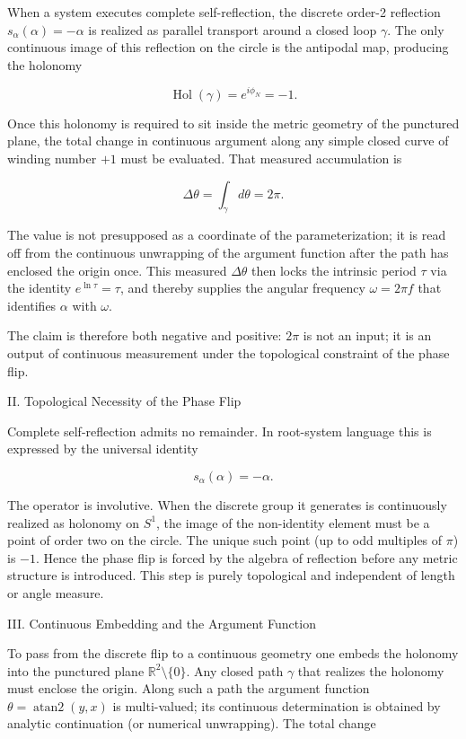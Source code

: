 When a system executes complete self-reflection, the discrete order-2 reflection \(s_\alpha(\alpha)=-\alpha\) is realized as parallel transport around a closed loop \(\gamma\). The only continuous image of this reflection on the circle is the antipodal map, producing the holonomy  

\[
\operatorname{Hol}(\gamma)=e^{i\phi_N}=-1.
\]

Once this holonomy is required to sit inside the metric geometry of the punctured plane, the total change in continuous argument along any simple closed curve of winding number \(+1\) must be evaluated. That measured accumulation is  

\[
\Delta\theta=\int_\gamma d\theta=2\pi.
\]

The value is not presupposed as a coordinate of the parameterization; it is read off from the continuous unwrapping of the argument function after the path has enclosed the origin once. This measured \(\Delta\theta\) then locks the intrinsic period \(\tau\) via the identity \(e^{\ln\tau}=\tau\), and thereby supplies the angular frequency \(\omega=2\pi f\) that identifies \(\alpha\) with \(\omega\).

The claim is therefore both negative and positive: \(2\pi\) is not an input; it is an output of continuous measurement under the topological constraint of the phase flip.

II. Topological Necessity of the Phase Flip

Complete self-reflection admits no remainder. In root-system language this is expressed by the universal identity  

\[
s_\alpha(\alpha)=-\alpha.
\]

The operator is involutive. When the discrete group it generates is continuously realized as holonomy on \(S^1\), the image of the non-identity element must be a point of order two on the circle. The unique such point (up to odd multiples of \(\pi\)) is \(-1\). Hence the phase flip is forced by the algebra of reflection before any metric structure is introduced. This step is purely topological and independent of length or angle measure.

III. Continuous Embedding and the Argument Function

To pass from the discrete flip to a continuous geometry one embeds the holonomy into the punctured plane \(\mathbb{R}^2\setminus\{0\}\). Any closed path \(\gamma\) that realizes the holonomy must enclose the origin. Along such a path the argument function \(\theta=\operatorname{atan2}(y,x)\) is multi-valued; its continuous determination is obtained by analytic continuation (or numerical unwrapping). The total change  

